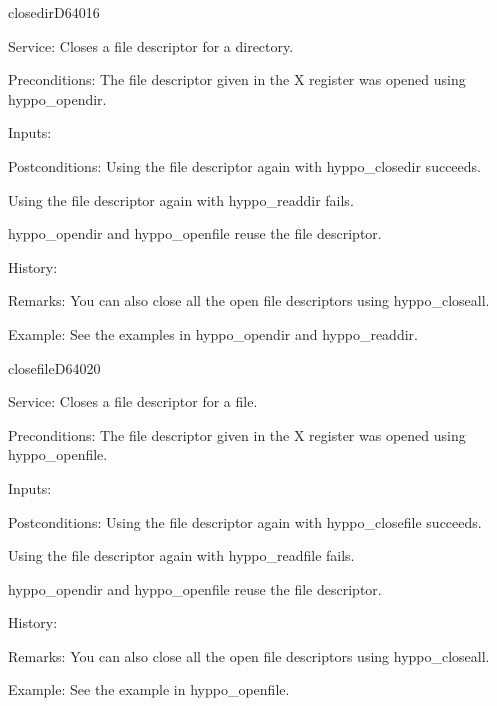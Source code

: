 \newpage
\begin{hyppotrap}{closedir}{D640}{16}
\item [Service:]
  Closes a file descriptor for a directory.
\item [Preconditions:]
  The file descriptor given in the X register was opened using hyppo\_opendir.
\item [Inputs:]
\item [Postconditions:]
  Using the file descriptor again with hyppo\_closedir succeeds.

  Using the file descriptor again with hyppo\_readdir fails.

  hyppo\_opendir and hyppo\_openfile reuse the file descriptor.
\item [History:]
\item [Remarks:]
  You can also close all the open file descriptors using hyppo\_closeall.
\item [Example:]
  See the examples in hyppo\_opendir and hyppo\_readdir.
\end{hyppotrap}


\newpage
\begin{hyppotrap}{closefile}{D640}{20}
\item [Service:]
  Closes a file descriptor for a file.
\item [Preconditions:]
  The file descriptor given in the X register was opened using hyppo\_openfile.
\item [Inputs:]
\item [Postconditions:]
  Using the file descriptor again with hyppo\_closefile succeeds.

  Using the file descriptor again with hyppo\_readfile fails.

  hyppo\_opendir and hyppo\_openfile reuse the file descriptor.
\item [History:]
\item [Remarks:]
  You can also close all the open file descriptors using hyppo\_closeall.
\item [Example:]
  See the example in hyppo\_openfile.
\end{hyppotrap}


